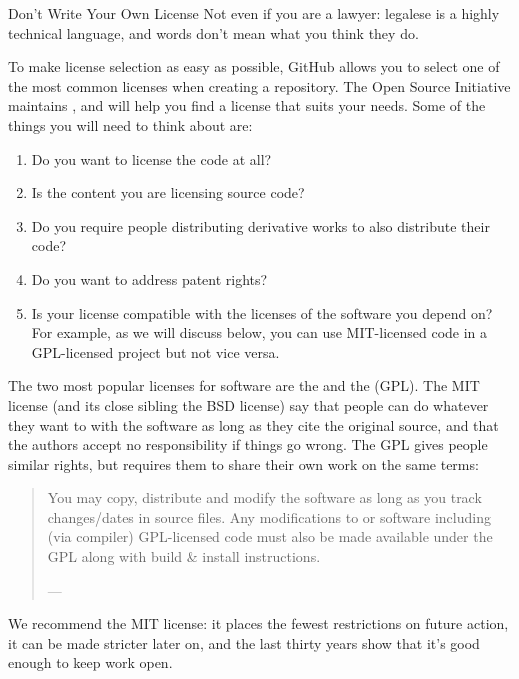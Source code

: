 \begin{aside}{Don't Write Your Own License}
  Not even if you are a lawyer:
  legalese is a highly technical language,
  and words don't mean what you think they do.
\end{aside}

To make license selection as easy as possible,
GitHub allows you to select one of the most common licenses when creating a repository.
The Open Source Initiative maintains ,
and  will help you find a license that suits your needs.
Some of the things you will need to think about are:

\begin{enumerate}
\item
  Do you want to license the code at all?
\item
  Is the content you are licensing source code?
\item
  Do you require people distributing derivative works to also distribute their code?
\item
  Do you want to address patent rights?
\item
  Is your license compatible with the licenses of the software you depend on?
  For example, as we will discuss below,
  you can use MIT-licensed code in a GPL-licensed project but not vice versa.
\end{enumerate}

The two most popular licenses for software are
the  and the  (GPL).
The MIT license (and its close sibling the BSD license)
say that people can do whatever they want to with the software as long as they cite the original source,
and that the authors accept no responsibility if things go wrong.
The GPL gives people similar rights,
but requires them to share their own work on the same terms:

\begin{quote}
You may copy, distribute and modify the software as long as you track changes/dates in source files.
Any modifications to or software including (via compiler) GPL-licensed code must also be made available under the GPL
along with build \& install instructions.

--- 
\end{quote}

We recommend the MIT license:
it places the fewest restrictions on future action,
it can be made stricter later on,
and the last thirty years show that it's good enough to keep work open.

